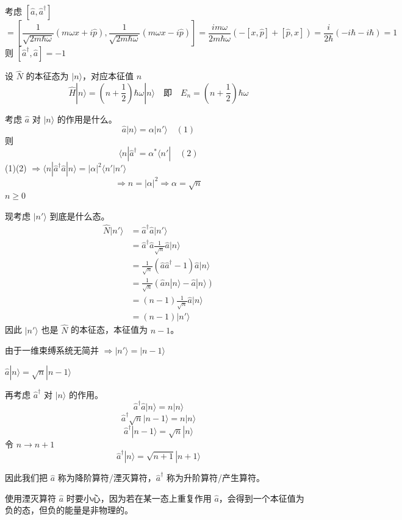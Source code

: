 \documentclass[lang=cn,10pt]{elegantbook}
\begin{document}
考虑 \([ \hat{a}, \hat{a}^\dagger ]\)
\[
= \left[ \frac{1}{\sqrt{2m\hbar\omega}} (m \omega x + i \hat{p}), \frac{1}{\sqrt{2m\hbar\omega}} (m \omega x - i \hat{p}) \right]
= \frac{im\omega}{2m\hbar\omega} (-[x, \hat{p}] + [\hat{p}, x])
= \frac{i}{2\hbar} (-i\hbar - i\hbar)
= 1
\]
则 \([ \hat{a}^\dagger, \hat{a} ] = -1\)

设 \(\hat{N}\) 的本征态为 \(|n\rangle\)，对应本征值 \(n\)
\[
\hat{H} |n\rangle = \left( n + \frac{1}{2} \right) \hbar \omega |n\rangle \quad \text{即} \quad E_n = \left( n + \frac{1}{2} \right) \hbar \omega
\]

考虑 \(\hat{a}\) 对 \(|n\rangle\) 的作用是什么。
\[
\hat{a} |n\rangle = \alpha |n'\rangle \quad (1)
\]
则
\[
\langle n | \hat{a}^\dagger = \alpha^* \langle n'| \quad (2)
\]
(1)(2) \(\Rightarrow \langle n | \hat{a}^\dagger \hat{a} | n \rangle = |\alpha|^2 \langle n' | n' \rangle\)
\[
\Rightarrow n = |\alpha|^2 \Rightarrow \alpha = \sqrt{n}
\]
\(n \geq 0\)

现考虑 \(|n'\rangle\) 到底是什么态。
\[
\begin{aligned}
	\hat{N} |n'\rangle
	&= \hat{a}^\dagger \hat{a} |n'\rangle \\
	&= \hat{a}^\dagger \hat{a} \frac{1}{\sqrt{n}} \hat{a} |n\rangle \\
	&= \frac{1}{\sqrt{n}} (\hat{a} \hat{a}^\dagger - 1) \hat{a} |n\rangle \\
	&= \frac{1}{\sqrt{n}} (\hat{a} n |n\rangle - \hat{a} |n\rangle) \\
	&= (n-1) \frac{1}{\sqrt{n}} \hat{a} |n\rangle \\
	&= (n-1) |n'\rangle
\end{aligned}
\]
因此 \(|n'\rangle\) 也是 \(\hat{N}\) 的本征态，本征值为 \(n-1\)。

由于一维束缚系统无简并 \(\Rightarrow |n'\rangle = |n-1\rangle\)

\(\hat{a} |n\rangle = \sqrt{n} |n-1\rangle\)

再考虑 \(\hat{a}^\dagger\) 对 \(|n\rangle\) 的作用。
\[
\hat{a}^\dagger \hat{a} |n\rangle = n |n\rangle
\]
\[
\hat{a}^\dagger \sqrt{n} |n-1\rangle = n |n\rangle
\]
\[
\hat{a}^\dagger |n-1\rangle = \sqrt{n} |n\rangle
\]
令 \(n \rightarrow n+1\)
\[
\hat{a}^\dagger |n\rangle = \sqrt{n+1} |n+1\rangle
\]

因此我们把 \(\hat{a}\) 称为降阶算符/湮灭算符，\(\hat{a}^\dagger\) 称为升阶算符/产生算符。

使用湮灭算符 \(\hat{a}\) 时要小心，因为若在某一态上重复作用 \(\hat{a}\)，会得到一个本征值为负的态，但负的能量是非物理的。
\end{document}
